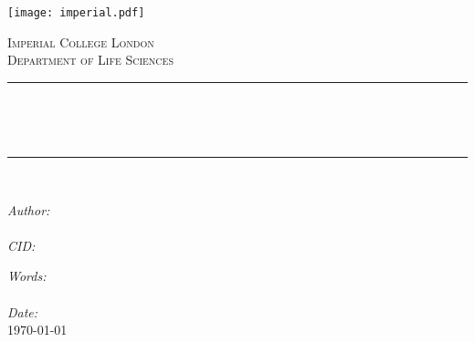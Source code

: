 \begin{titlepage}
    
    \newcommand{\HRule}{\rule{\linewidth}{0.5mm}} %

    
    \texttt{[image: imperial.pdf]}\\[0.5cm] 
    
    \center %

    \textsc{\Large Imperial College London}\\[0.5cm] 
    \textsc{\large Department of Life Sciences}\\[0.5cm] 
    
    \HRule \\%
    \linespread{1.1}
    { \huge \bfseries \reporttitle\par}\\ %
    \HRule \\[1.5cm]
     
    
    \begin{minipage}{0.4\textwidth}
    \begin{flushleft} \large
    \emph{Author:}\\
    \reportauthor \\ [0.5cm] %
    \emph{CID:}\\
    \reportcid %
    \end{flushleft}
    \end{minipage}
    \begin{minipage}{0.4\textwidth}
    \begin{flushright} \large
    \emph{Words:} \\
    \words \\ [0.5cm] %
    \emph{Date:} \\
    \today \\ [0.5cm] %
    \end{flushright}
    \end{minipage}
    

\end{titlepage}
